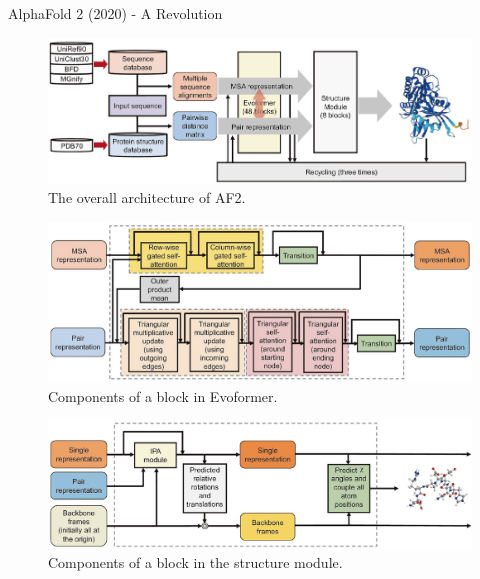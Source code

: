 \begin{frame}[allowframebreaks]{AlphaFold 2 (2020) - A Revolution}
    \framebreak

    \begin{figure}
        \centering
        \includegraphics[width=\linewidth,height=0.85\textheight,keepaspectratio]{images/science/alphafold-2-application-1.png}
        \caption*{The overall architecture of AF2.}
    \end{figure}

    \framebreak

    \begin{figure}
        \centering
        \includegraphics[width=\linewidth,height=0.85\textheight,keepaspectratio]{images/science/alphafold-2-application-2.png}
        \caption*{Components of a block in Evoformer.}
    \end{figure}

    \framebreak

    \begin{figure}
        \centering
        \includegraphics[width=\linewidth,height=0.85\textheight,keepaspectratio]{images/science/alphafold-2-application-3.png}
        \caption*{Components of a block in the structure module.}
    \end{figure}


\end{frame}
